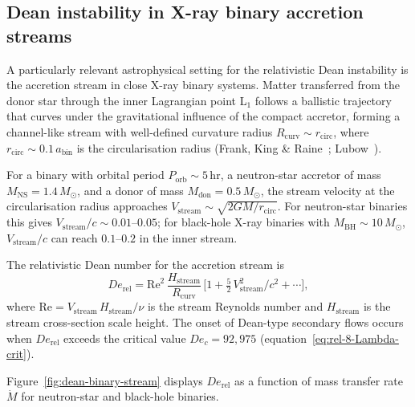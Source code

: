 \subsection{Dean instability in X-ray binary accretion streams}
\label{sec:rel-76-binary}

A particularly relevant astrophysical setting for the relativistic
Dean instability is the accretion stream in close X-ray binary systems.
Matter transferred from the donor star through the inner Lagrangian
point L$_{1}$ follows a ballistic trajectory that curves under the
gravitational influence of the compact accretor, forming a channel-like
stream with well-defined curvature radius $R_{\mathrm{curv}}\sim
r_{\mathrm{circ}}$, where $r_{\mathrm{circ}} \sim 0.1\,a_{\mathrm{bin}}$
is the circularisation radius
(Frank, King \& Raine~\cite{FrankKingRaine2002};
Lubow~\cite{Lubow1989}).

For a binary with orbital period $P_{\mathrm{orb}} \sim 5\,\mathrm{hr}$,
a neutron-star accretor of mass $M_{\mathrm{NS}} = 1.4\,M_{\odot}$,
and a donor of mass $M_{\mathrm{don}} = 0.5\,M_{\odot}$, the stream
velocity at the circularisation radius approaches
$V_{\mathrm{stream}} \sim \sqrt{2GM/r_{\mathrm{circ}}}$.  For
neutron-star binaries this gives $V_{\mathrm{stream}}/c \sim
0.01$--$0.05$; for black-hole X-ray binaries with
$M_{\mathrm{BH}} \sim 10\,M_{\odot}$, $V_{\mathrm{stream}}/c$
can reach $0.1$--$0.2$ in the inner stream.

The relativistic Dean number for the accretion stream is
\begin{equation}
  De_{\mathrm{rel}} = \mathrm{Re}^{2}\,\frac{H_{\mathrm{stream}}}
  {R_{\mathrm{curv}}}\,
  \bigl[1 + \tfrac{5}{2}\,V_{\mathrm{stream}}^{2}/c^{2} + \cdots\bigr],
  \label{eq:rel-8-De-binary}
\end{equation}
where $\mathrm{Re} = V_{\mathrm{stream}}\,H_{\mathrm{stream}}/\nu$
is the stream Reynolds number and $H_{\mathrm{stream}}$ is the stream
cross-section scale height.  The onset of Dean-type secondary flows
occurs when $De_{\mathrm{rel}}$ exceeds the critical value
$De_{c} = 92{,}975$ (equation~\eqref{eq:rel-8-Lambda-crit}).

Figure~\ref{fig:dean-binary-stream} displays $De_{\mathrm{rel}}$
as a function of mass transfer rate $\dot{M}$ for neutron-star and
black-hole binaries.

